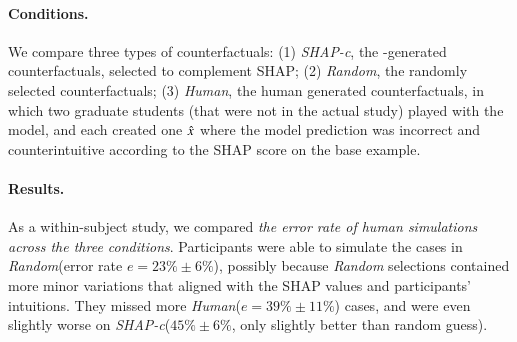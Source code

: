 

\newcommand{\cshap}{\emph{SHAP-c}\xspace}
\newcommand{\crandom}{\emph{Random}\xspace}
\newcommand{\chuman}{\emph{Human}\xspace}
\paragraph{Conditions.} 
We compare three types of counterfactuals:
(1) \cshap, the \sysname-generated counterfactuals, selected to complement SHAP; 
(2) \crandom, the randomly selected \sysname counterfactuals; 
(3) \chuman, the human generated counterfactuals, in which two graduate students (that were not in the actual study) played with the model, and each created one $\hat{x}$ where the model prediction was incorrect and counterintuitive according to the SHAP score on the base example.

\paragraph{Results.}
As a within-subject study, we compared \emph{the error rate of human simulations across the three conditions}.
Participants were able to simulate the cases in \crandom (error rate $e=23\%\pm6\%$), possibly because \crandom selections contained more minor variations that aligned with the SHAP values and participants' intuitions.
They missed more \chuman ($e=39\%\pm11\%$) cases, and were even slightly worse on \cshap ($45\%\pm 6\%$, only slightly better than random guess).%

